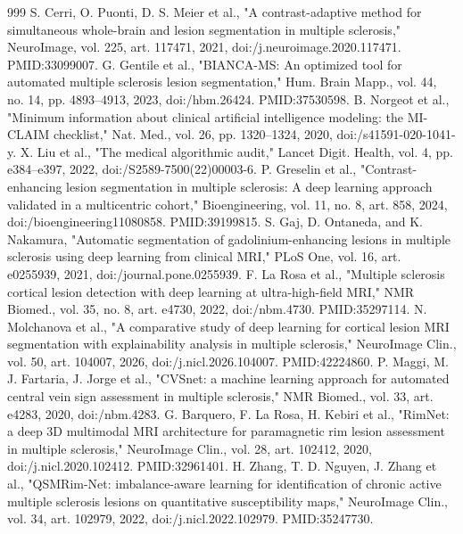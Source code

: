 \documentclass[journal,twoside,web]{ieeecolor}
\begin{document}
\begin{thebibliography}{999}
 S. Cerri, O. Puonti, D. S. Meier et al., "A contrast-adaptive method for simultaneous whole-brain and lesion segmentation in multiple sclerosis," NeuroImage, vol. 225, art. 117471, 2021, doi:/\allowbreak j.neuroimage.2020.117471. PMID:33099007.
 G. Gentile et al., "BIANCA-MS: An optimized tool for automated multiple sclerosis lesion segmentation," Hum. Brain Mapp., vol. 44, no. 14, pp. 4893--4913, 2023, doi:/\allowbreak hbm.26424. PMID:37530598.
 B. Norgeot et al., "Minimum information about clinical artificial intelligence modeling: the MI-CLAIM checklist," Nat. Med., vol. 26, pp. 1320--1324, 2020, doi:/\allowbreak s41591-020-1041-y.
 X. Liu et al., "The medical algorithmic audit," Lancet Digit. Health, vol. 4, pp. e384--e397, 2022, doi:/\allowbreak S2589-7500(22)00003-6.
 P. Greselin et al., "Contrast-enhancing lesion segmentation in multiple sclerosis: A deep learning approach validated in a multicentric cohort," Bioengineering, vol. 11, no. 8, art. 858, 2024, doi:/\allowbreak bioengineering11080858. PMID:39199815.
 S. Gaj, D. Ontaneda, and K. Nakamura, "Automatic segmentation of gadolinium-enhancing lesions in multiple sclerosis using deep learning from clinical MRI," PLoS One, vol. 16, art. e0255939, 2021, doi:/\allowbreak journal.pone.0255939.
 F. La Rosa et al., "Multiple sclerosis cortical lesion detection with deep learning at ultra-high-field MRI," NMR Biomed., vol. 35, no. 8, art. e4730, 2022, doi:/\allowbreak nbm.4730. PMID:35297114.
 N. Molchanova et al., "A comparative study of deep learning for cortical lesion MRI segmentation with explainability analysis in multiple sclerosis," NeuroImage Clin., vol. 50, art. 104007, 2026, doi:/\allowbreak j.nicl.2026.104007. PMID:42224860.
 P. Maggi, M. J. Fartaria, J. Jorge et al., "CVSnet: a machine learning approach for automated central vein sign assessment in multiple sclerosis," NMR Biomed., vol. 33, art. e4283, 2020, doi:/\allowbreak nbm.4283.
 G. Barquero, F. La Rosa, H. Kebiri et al., "RimNet: a deep 3D multimodal MRI architecture for paramagnetic rim lesion assessment in multiple sclerosis," NeuroImage Clin., vol. 28, art. 102412, 2020, doi:/\allowbreak j.nicl.2020.102412. PMID:32961401.
 H. Zhang, T. D. Nguyen, J. Zhang et al., "QSMRim-Net: imbalance-aware learning for identification of chronic active multiple sclerosis lesions on quantitative susceptibility maps," NeuroImage Clin., vol. 34, art. 102979, 2022, doi:/\allowbreak j.nicl.2022.102979. PMID:35247730.

\end{thebibliography}
\end{document}
